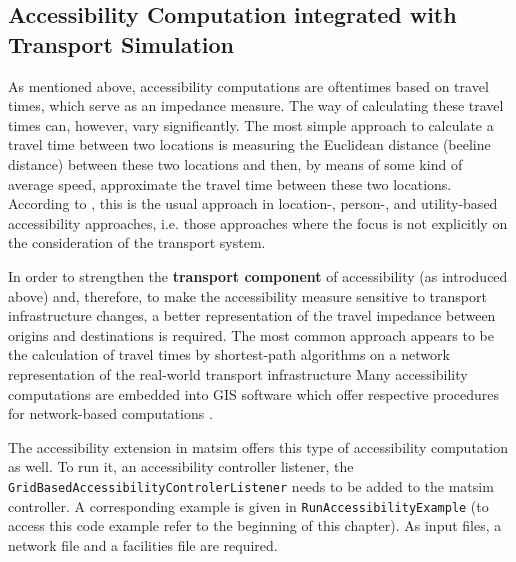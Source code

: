 \subsection{Accessibility Computation integrated with Transport Simulation}
As mentioned above, accessibility computations are oftentimes based on travel times, which serve as an impedance 
measure. The way of calculating these travel times can, however, vary significantly. The most simple approach to calculate 
a travel time between two locations is measuring the Euclidean distance (beeline distance) between these two locations and then, 
by means of some kind of average speed, approximate the travel time between these two locations. According to 
\citet{Geurs2004AccessibilityReview}, this is the usual approach in location-, person-, and utility-based accessibility 
approaches, i.e. those approaches where the focus is not explicitly on the consideration of the transport system.


In order to strengthen the \textbf{transport component} of accessibility (as introduced above) and, therefore, to make 
the accessibility measure sensitive to transport infrastructure changes, a better representation of the travel 
impedance between origins and destinations is required. The most common approach appears to be the calculation of travel 
times by shortest-path algorithms on a network representation of the real-world transport infrastructure
Many accessibility computations are embedded into GIS software which offer respective procedures for network-based 
computations \citep{BBSR20xxErreichbarkeitsmodell, CurtisEtAl2013AccessibilityPolicyInnovation, BuettnerEtAl2010Erreichbarkeitsatlas}.



The accessibility extension in \gls{matsim} offers this type of accessibility computation as well. To run it, an 
accessibility controller listener, \eg the \texttt{GridBasedAccessibilityControlerListener} needs to be added to 
the \gls{matsim} controller. A corresponding example is given in \texttt{RunAccessibilityExample} (to access this 
code example refer to the beginning of this chapter). As input files, a network file and a facilities file are required.

